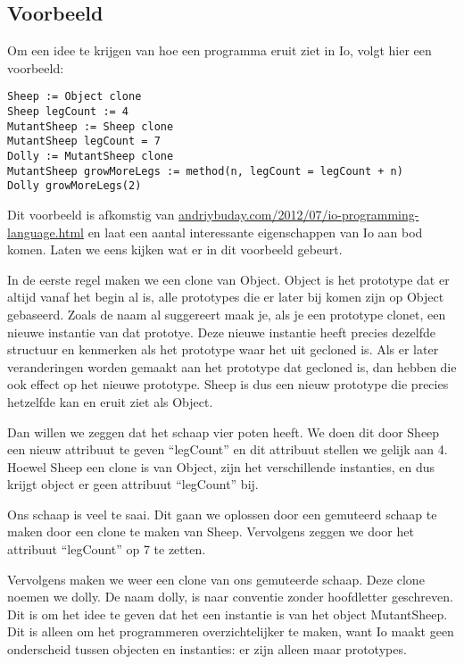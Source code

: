 \documentclass[12pt]{article}
\begin{document}
\subsection*{Voorbeeld}
Om een idee te krijgen van hoe een programma eruit ziet in Io, volgt hier een voorbeeld:
\begin{lstlisting}[frame=single]
Sheep := Object clone
Sheep legCount := 4
MutantSheep := Sheep clone
MutantSheep legCount = 7
Dolly := MutantSheep clone
MutantSheep growMoreLegs := method(n, legCount = legCount + n)
Dolly growMoreLegs(2)
\end{lstlisting}
Dit voorbeeld is afkomstig van \url{andriybuday.com/2012/07/io-programming-language.html} en laat een aantal interessante eigenschappen van Io aan bod komen. Laten we eens kijken wat er in dit voorbeeld gebeurt.\newline

In de eerste regel maken we een clone van Object. Object is het prototype dat er altijd vanaf het begin al is,
alle prototypes die er later bij komen zijn op Object gebaseerd.
Zoals de naam al suggereert maak je, als je een prototype clonet, een nieuwe instantie van dat prototye.
Deze nieuwe instantie heeft precies dezelfde structuur en kenmerken als het prototype waar het uit gecloned is.
Als er later veranderingen worden gemaakt aan het prototype dat gecloned is, dan hebben die ook effect op het nieuwe prototype.
Sheep is dus een nieuw prototype die precies hetzelfde kan en eruit ziet als Object.\newline

Dan willen we zeggen dat het schaap vier poten heeft.
We doen dit door Sheep een nieuw attribuut te geven ``legCount'' en dit attribuut stellen we gelijk aan 4.
Hoewel Sheep een clone is van Object, zijn het verschillende instanties, en dus krijgt object er geen attribuut ``legCount'' bij.\newline

Ons schaap is veel te saai. Dit gaan we oplossen door een gemuteerd schaap te maken door een clone te maken van Sheep. Vervolgens zeggen we door het attribuut ``legCount'' op 7 te zetten.\newline

Vervolgens maken we weer een clone van ons gemuteerde schaap. Deze clone noemen we dolly. De naam dolly, is naar conventie zonder hoofdletter geschreven.
Dit is om het idee te geven dat het een instantie is van het object MutantSheep.
Dit is alleen om het programmeren overzichtelijker te maken, want Io maakt geen onderscheid tussen objecten en instanties: er zijn alleen maar prototypes.\newline
\end{document}
